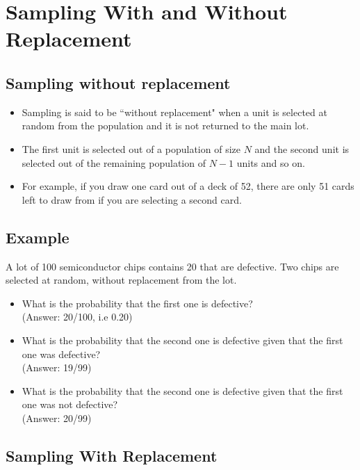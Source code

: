 \documentclass[a4paper,12pt]{article}
\begin{document}

\section*{Sampling With and Without Replacement}
\subsection*{Sampling without replacement}
		\begin{itemize}
			\item Sampling is said to be ``without replacement" when a unit is selected at random from the population and it is not returned to the main lot. \item The first unit is selected out of a population of size $N$ and the second unit is selected out of the remaining population of  $N-1$ units and so on.
			\item For example, if you draw one card out of a deck of 52, there are only 51 cards left to draw from if you are selecting a second card.
		\end{itemize}
		

\subsection*{Example}
A lot of 100 semiconductor chips contains 20 that are defective.
Two chips are selected at random, without replacement from the lot.
\begin{itemize}
	\item What is the probability that the first one is defective? \\(Answer: 20/100, i.e 0.20)
	\item What is the probability that the second one is defective given that the first one was defective? \\(Answer: 19/99)
	\item What is the probability that the second one is defective given that the first one was not defective? \\(Answer: 20/99)
\end{itemize}
	
		

\subsection*{Sampling With Replacement }
\end{document}
